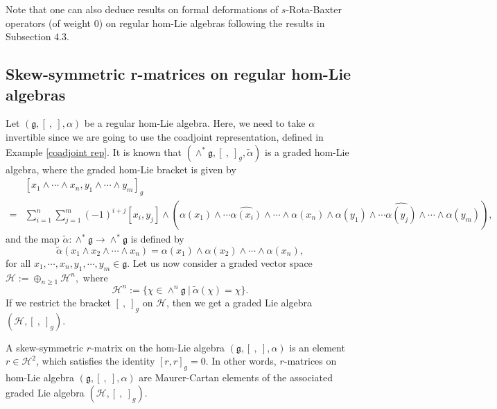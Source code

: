 \documentclass[a4paper,11pt]{amsart}
\theoremstyle{plain}
\theoremstyle{definition}
\theoremstyle{remark}
\numberwithin{equation}{section}
\begin{document}
Note that one can also deduce results on formal deformations of $s$-Rota-Baxter operators (of weight $0$) on regular hom-Lie algebras following the results in Subsection $4.3$.

\subsection{Skew-symmetric r-matrices on regular hom-Lie algebras}
Let $(\mathfrak{g},[~,~],\alpha)$ be a regular hom-Lie algebra. Here, we need to take $\alpha$ invertible since we are going to use the coadjoint representation, defined in Example \ref{coadjoint rep}. It is known that $(\wedge^*\mathfrak{g},[~,~]_{g},\tilde\alpha)$ is a graded hom-Lie algebra, where the graded hom-Lie bracket is given by  
\begin{align*}
&[x_1\wedge\cdots\wedge x_n,y_1\wedge \cdots\wedge y_m]_{g}\\
=&\sum_{i=1}^n\sum_{j=1}^m (-1)^{i+j}[x_i,y_j]\wedge (\alpha(x_1)\wedge\cdots \widehat{\alpha(x_i)}\wedge\cdots\wedge \alpha(x_n)\wedge \alpha(y_1)\wedge \cdots \widehat{\alpha(y_j)}\wedge\cdots\wedge \alpha(y_m)),
\end{align*}
and the map $\tilde{\alpha}:\wedge^*\mathfrak{g}\rightarrow\wedge^*\mathfrak{g}$ is defined by 
$$\tilde{\alpha}(x_1\wedge x_2\wedge\cdots\wedge x_n)=\alpha(x_1)\wedge\alpha(x_2)\wedge\cdots\wedge \alpha(x_n),$$
for all $x_1,\cdots,x_n,y_1,\cdots,y_m\in \mathfrak{g}$.
Let us now consider a graded vector space $\mathcal{H}:=\oplus_{n\geq 1} \mathcal{H}^n,$ where 
$$\mathcal{H}^n:=\{\chi\in \wedge^n\mathfrak{g}~|~\tilde\alpha(\chi)=\chi\}.$$ 
If we restrict the bracket $[~,~]_g$ on $\mathcal{H}$, then we get a graded Lie algebra $(\mathcal{H},[~,~]_g)$.

A skew-symmetric $r$-matrix \cite{Yau1} on the hom-Lie algebra $(\mathfrak{g},[~,~],\alpha)$ is an element $r\in \mathcal{H}^2$, which satisfies the identity $[r,r]_g=0$.  In other words, $r$-matrices on hom-Lie algebra $(\mathfrak{g},[~,~],\alpha)$ are Maurer-Cartan elements of the associated graded Lie algebra $(\mathcal{H},[~,~]_g)$.
\end{document}
